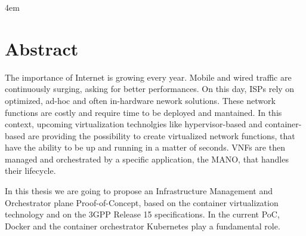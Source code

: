 \cleardoublepage
{}

\thispagestyle{empty}

\vspace*{\fill}
\par
\begingroup
\leftskip4em
\rightskip\leftskip
\section*{\centering Abstract}
The importance of Internet is growing every year. Mobile and wired traffic are
continuously surging, asking for better performances. On this day, ISPs rely on
optimized, ad-hoc and often in-hardware nework solutions. These network
functions are costly and require time to be deployed and mantained. In this
context, upcoming virtualization technolgies like hypervisor-based and
container-based are providing the possibility to create virtualized network
functions, that have the ability to be up and running in a matter of seconds.
VNFs are then managed and orchestrated by a specific application, the MANO, that
handles their lifecycle.

In this thesis we are going to propose an Infrastructure Management and
Orchestrator plane Proof-of-Concept, based on the container virtualization
technology and on the 3GPP Release 15 specifications. In the current PoC, Docker
and the container orchestrator Kubernetes play a fundamental role.
\par
\endgroup
\vspace*{\fill}
